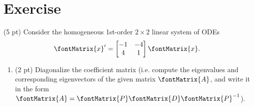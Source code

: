 %
%
%
\section{Exercise}

(5 pt) Consider the homogeneous 1st-order $2 \times 2$ linear system of ODEs
\begin{align}
\fontMatrix{x}'
=
\begin{bmatrix}%
-1	&	-4	\\
4	&	1
\end{bmatrix}%
\fontMatrix{x}.%
\label{eq : Quiz21Z ODE}
\end{align}
\begin{enumerate}[label=(\alph*)]
\item (2 pt) Diagonalize the coefficient matrix (i.e. compute the eigenvalues and corresponding eigenvectors of the given matrix $\fontMatrix{A}$, and write it in the form $\fontMatrix{A} = \fontMatrix{P} \fontMatrix{D} \fontMatrix{P}^{-1}$).
\end{enumerate}

